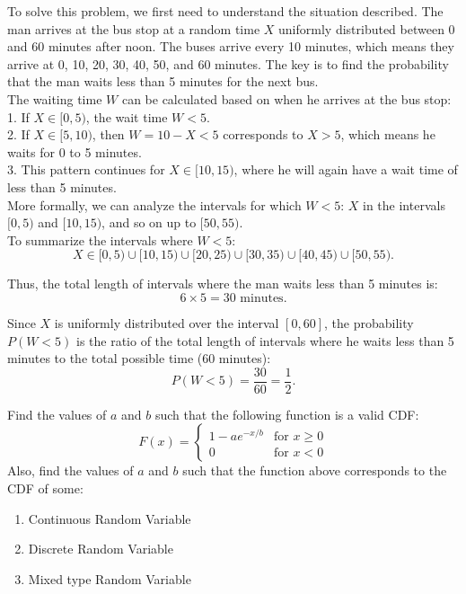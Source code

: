 \begin{solution}
To solve this problem, we first need to understand the situation described. The man arrives at the bus stop at a random time \(X\) uniformly distributed between 0 and 60 minutes after noon. The buses arrive every 10 minutes, which means they arrive at 0, 10, 20, 30, 40, 50, and 60 minutes. The key is to find the probability that the man waits less than 5 minutes for the next bus.\\

The waiting time \(W\) can be calculated based on when he arrives at the bus stop:\\

1. If \(X \in [0, 5)\), the wait time \(W < 5\).\\
2. If \(X \in [5, 10)\), then \(W = 10 - X < 5\) corresponds to \(X > 5\), which means he waits for 0 to 5 minutes.\\
3. This pattern continues for \(X \in [10, 15)\), where he will again have a wait time of less than 5 minutes.\\

More formally, we can analyze the intervals for which \(W < 5\): \(X\) in the intervals \([0, 5)\) and \([10, 15)\), and so on up to \([50, 55)\).\\

To summarize the intervals where \(W < 5\):
\[
X \in [0, 5) \cup [10, 15) \cup [20, 25) \cup [30, 35) \cup [40, 45) \cup [50, 55).
\]

Thus, the total length of intervals where the man waits less than 5 minutes is:
\[
6 \times 5 = 30 \text{ minutes}.
\]

Since \(X\) is uniformly distributed over the interval \([0, 60]\), the probability \(P(W < 5)\) is the ratio of the total length of intervals where he waits less than 5 minutes to the total possible time (60 minutes):
\[
P(W < 5) = \frac{30}{60} = \frac{1}{2}.
\]
\end{solution}


\begin{exercise}
Find the values of \( a \) and \( b \) such that the following function is a valid CDF:
\[
F(x) = 
\begin{cases}
1 - ae^{-x/b} & \text{for } x \geq 0 \\
0 & \text{for } x < 0
\end{cases}
\]
Also, find the values of \( a \) and \( b \) such that the function above corresponds to the CDF of some:
\begin{enumerate}
    \item Continuous Random Variable
    \item Discrete Random Variable
    \item Mixed type Random Variable
\end{enumerate}
\end{exercise}

